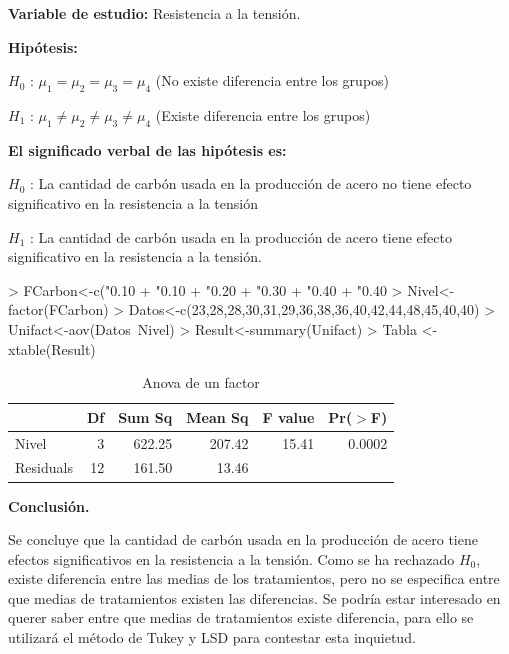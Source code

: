 \documentclass[12pt,letterpaper]{report}
\begin{document}
\textbf{Variable de estudio:} Resistencia a la tensión.

\textbf{Hipótesis:}

$H_{0}$ : $\mu_1 = \mu_2 = \mu_3 = \mu_4$ (No existe diferencia entre los grupos)

$H_{1}$ : $\mu_1 \not= \mu_2 \not= \mu_3 \not= \mu_4$ (Existe diferencia entre los grupos)

\textbf{El significado verbal de las hipótesis es:}

\textbf{$H_{0}$} : La cantidad de carbón usada en la producción de acero no tiene efecto significativo en la resistencia a la tensión

\textbf{$H_{1}$} : La cantidad de carbón usada en la producción de acero tiene efecto significativo en la resistencia a la tensión.



\begin{Schunk}
\begin{Sinput}
> FCarbon<-c("0.10%
+            "0.10%
+            "0.20%
+            "0.30%
+            "0.40%
+            "0.40%
> Nivel<-factor(FCarbon)
> Datos<-c(23,28,28,30,31,29,36,38,36,40,42,44,48,45,40,40)
> Unifact<-aov(Datos~Nivel)
> Result<-summary(Unifact)
> Tabla <- xtable(Result)
\end{Sinput}
\end{Schunk}

\begin{table}[ht]
\centering
\begin{tabular}{lrrrrr}
  \hline
 & Df & Sum Sq & Mean Sq & F value & Pr($>$F) \\ 
  \hline
Nivel       & 3 & 622.25 & 207.42 & 15.41 & 0.0002 \\ 
  Residuals   & 12 & 161.50 & 13.46 &  &  \\ 
   \hline
\end{tabular}
\caption{Anova de un factor}
\end{table}
\newpage

\textbf{Conclusión.}

Se concluye que la cantidad de carbón usada en la producción de acero tiene efectos
significativos en la resistencia a la tensión.
Como se ha rechazado $H_0$, existe diferencia entre las medias de los tratamientos, pero no
se especifica entre que medias de tratamientos existen las diferencias.
Se podría estar interesado en querer saber entre que medias de tratamientos existe
diferencia, para ello se utilizará el método de Tukey y LSD para contestar esta inquietud.
\end{document}

